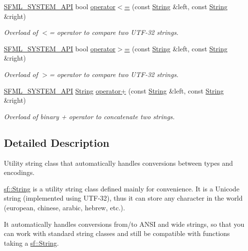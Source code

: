 \begin{DoxyCompactItemize}
\hyperlink{_system_2_export_8hpp_a6476c9e422606477a4c23d92b1d79a1f}{S\-F\-M\-L\-\_\-\-S\-Y\-S\-T\-E\-M\-\_\-\-A\-P\-I} bool \hyperlink{classsf_1_1_string_abd342b6094b81cd086c7929b53b112ae}{operator$<$=} (const \hyperlink{classsf_1_1_string}{String} \&left, const \hyperlink{classsf_1_1_string}{String} \&right)
\begin{DoxyCompactList}\small\item\em Overload of $<$= operator to compare two U\-T\-F-\/32 strings. \end{DoxyCompactList}\item 
\hyperlink{_system_2_export_8hpp_a6476c9e422606477a4c23d92b1d79a1f}{S\-F\-M\-L\-\_\-\-S\-Y\-S\-T\-E\-M\-\_\-\-A\-P\-I} bool \hyperlink{classsf_1_1_string_a8d2979d7829d6616330a768956f251e1}{operator$>$=} (const \hyperlink{classsf_1_1_string}{String} \&left, const \hyperlink{classsf_1_1_string}{String} \&right)
\begin{DoxyCompactList}\small\item\em Overload of $>$= operator to compare two U\-T\-F-\/32 strings. \end{DoxyCompactList}\item 
\hyperlink{_system_2_export_8hpp_a6476c9e422606477a4c23d92b1d79a1f}{S\-F\-M\-L\-\_\-\-S\-Y\-S\-T\-E\-M\-\_\-\-A\-P\-I} \hyperlink{classsf_1_1_string}{String} \hyperlink{classsf_1_1_string_a55ef2bf7dc6b295ef7127b0bc1e58760}{operator+} (const \hyperlink{classsf_1_1_string}{String} \&left, const \hyperlink{classsf_1_1_string}{String} \&right)
\begin{DoxyCompactList}\small\item\em Overload of binary + operator to concatenate two strings. \end{DoxyCompactList}\end{DoxyCompactItemize}


\subsection{Detailed Description}
Utility string class that automatically handles conversions between types and encodings. 

\hyperlink{classsf_1_1_string}{sf\-::\-String} is a utility string class defined mainly for convenience. It is a Unicode string (implemented using U\-T\-F-\/32), thus it can store any character in the world (european, chinese, arabic, hebrew, etc.).

It automatically handles conversions from/to A\-N\-S\-I and wide strings, so that you can work with standard string classes and still be compatible with functions taking a \hyperlink{classsf_1_1_string}{sf\-::\-String}.


